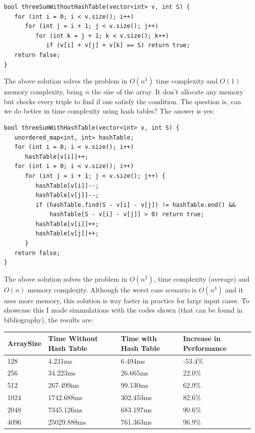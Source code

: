 \begin{lstlisting}
bool threeSumWithoutHashTable(vector<int> v, int S) {
   for (int i = 0; i < v.size(); i++)
      for (int j = i + 1; j < v.size(); j++)
         for (int k = j + 1; k < v.size(); k++)
            if (v[i] + v[j] + v[k] == S) return true;
   return false;
}
\end{lstlisting}

\medskip

The above solution solves the problem in \( O(n^3) \) time complexity and \( O(1) \) memory complexity, being \( n \) the size of the array. It don't allocate any memory but checks every triple to find if one satisfy the condition. The question is, can we do better in time complexity using hash tables? The answer is yes:

\medskip

\begin{lstlisting}
bool threeSumWithHashTable(vector<int> v, int S) {
   unordered_map<int, int> hashTable; 
   for (int i = 0; i < v.size(); i++)
      hashTable[v[i]]++;
   for (int i = 0; i < v.size(); i++)
      for (int j = i + 1; j < v.size(); j++) {
         hashTable[v[i]]--;
         hashTable[v[j]]--;         
         if (hashTable.find(S - v[i] - v[j]) != hashTable.end() &&
             hashTable[S - v[i] - v[j]] > 0) return true;
         hashTable[v[i]]++;
         hashTable[v[j]]++;
      }
   return false;
}
\end{lstlisting}

\medskip

The above solution solves the problem in \( O(n^2) \), time complexity (average) and \( O(n) \) memory complexity. Although the worst case scenario is \( O(n^3) \) and it uses more memory, this solution is way faster in practice for large input cases. To showcase this I made simmulations with the codes shown (that can be found in bibliography), the results are: \\

\bigskip

\begin{tabular}{|l|l|l|l|}
  \hline
  ArraySize & Time Without Hash Table & Time with Hash Table & Increase in Performance \\
  \hline
  128       & 4.231ms                 & 6.494ms              & -53.4\%                  \\
  \hline
  256       & 34.223ms                & 26.665ms             & 22.0\%                   \\
  \hline
  512       & 267.499ms               & 99.130ms             & 62.9\%                   \\
  \hline
  1024      & 1742.688ms              & 302.453ms            & 82.6\%                   \\
  \hline
  2048      & 7345.126ms              & 683.197ms            & 90.6\%                   \\
  \hline
  4096      & 25029.888ms             & 761.363ms            & 96.9\%                   \\
  \hline
\end{tabular}

